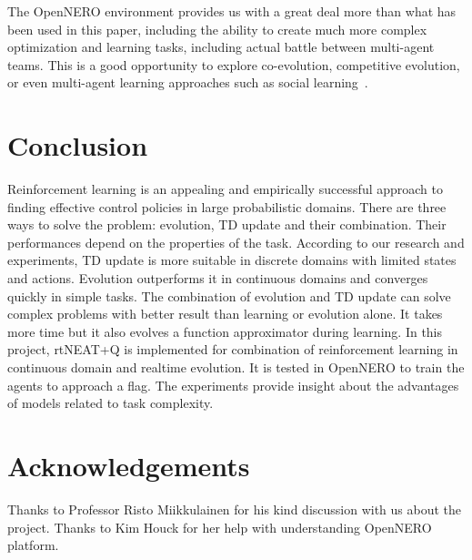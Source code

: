 \documentclass[letterpaper]{article}
\begin{document}
The OpenNERO environment provides us with a great deal more than what has been used in this paper, including the ability to create much more complex optimization and learning tasks, including actual battle between multi-agent teams. This is a good opportunity to explore co-evolution, competitive evolution, or even multi-agent learning approaches such as social learning~\cite{tansey2012accelerating}.

\section{Conclusion}
Reinforcement learning is an appealing and empirically successful approach to finding effective
control policies in large probabilistic domains. There are three ways to solve the problem: evolution, TD update and their combination. Their performances depend on the properties of the task. According to our research and experiments, TD update is more suitable in discrete domains with limited states and actions. Evolution outperforms it in continuous domains and converges quickly in simple tasks. The combination of evolution and TD update can solve complex problems with better result than learning or evolution alone. It takes more time but it also evolves a function approximator during learning. In this project, rtNEAT+Q is implemented for combination of reinforcement learning in continuous domain and realtime evolution. It is tested in OpenNERO to train the agents to approach a flag. The experiments provide insight about the advantages of models related to task complexity.

\section*{Acknowledgements}
Thanks to Professor Risto Miikkulainen for his kind discussion with us about the project. Thanks to Kim Houck for her help with understanding OpenNERO platform.



\end{document}
